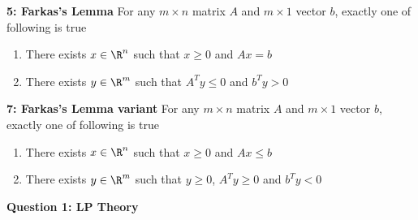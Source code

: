 \documentclass[11pt]{article}
\begin{document}
\renewcommand{\E}[1]{\mathsf{E}\left\{#1\right\}}
\newcommand{\V}[1]{\mathsf{V}\left\{#1\right\}}
\renewcommand{\P}[1]{\mathsf{P}\left(#1\right)}
\newcommand{\abs}[1]{\left|\,#1\,\right|}



\begin{lemma*}
    \textbf{5: Farkas's Lemma} For any $m\times n$ matrix $A$ and $m\times 1$ vector $b$, exactly one of following is true 
    \begin{enumerate}
        \item There exists $x\in \R^n$ such that $x\geq 0$ and $Ax = b$ 
        \item There exists $y\in \R^m$ such that $A^T y \leq 0$ and $b^T y > 0$ 
    \end{enumerate}
\end{lemma*}

\begin{lemma*}
    \textbf{7: Farkas's Lemma variant} For any $m\times n$ matrix $A$ and $m\times 1$ vector $b$, exactly one of following is true 
    \begin{enumerate}
        \item There exists $x\in \R^n$ such that $x\geq 0$ and $Ax \leq b$ 
        \item There exists $y\in \R^m$ such that $y\geq 0$, $A^T y \geq 0$ and $b^T y < 0$ 
    \end{enumerate}
\end{lemma*}

$ $\\

\textbf{Question 1: LP Theory} 
\end{document}
